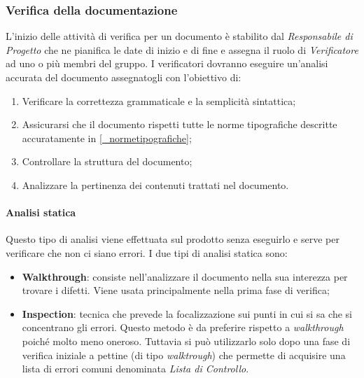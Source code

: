 \subsubsection{Verifica della documentazione}
L'inizio delle attività di verifica per un documento è stabilito dal \textit{Responsabile di Progetto} che ne pianifica le date di inizio e di fine e assegna il ruolo di \textit{Verificatore} ad uno o più membri del gruppo. I verificatori dovranno eseguire un'analisi accurata del documento assegnatogli con l'obiettivo di:
\begin{enumerate}
    \item Verificare la correttezza grammaticale e la semplicità sintattica;
    \item Assicurarsi che il documento rispetti tutte le norme tipografiche descritte accuratamente in \ref{_normetipografiche};
    \item Controllare la struttura del documento;
    \item Analizzare la pertinenza dei contenuti trattati nel documento.
\end{enumerate}

\paragraph{Analisi statica}
Questo tipo di analisi viene effettuata sul prodotto senza eseguirlo e serve per verificare che non ci siano errori. I due tipi di analisi statica sono:
\begin{itemize}
    \item \textbf{Walkthrough}: consiste nell'analizzare il documento nella sua interezza per trovare i difetti. Viene usata principalmente nella prima fase di verifica;
    \item \textbf{Inspection}: tecnica che prevede la focalizzazione sui punti in cui si sa che si concentrano gli errori. Questo metodo è da preferire rispetto a \textit{walkthrough} poiché molto meno oneroso. Tuttavia si può utilizzarlo solo dopo una fase di verifica iniziale a pettine (di tipo \textit{walktrough}) che permette di acquisire una lista di errori comuni denominata \textit{Lista di Controllo}.
\end{itemize}

